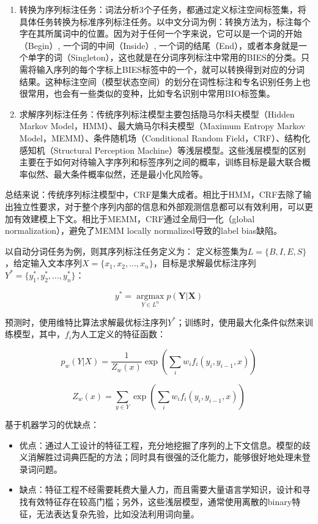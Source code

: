 \begin{enumerate}
\item 转换为序列标注任务：词法分析3个子任务，都通过定义标注空间标签集，将具体任务转换为标准序列标注任务。以中文分词为例：转换方法为，标注每个字在其所属词中的位置。因为对于任何一个字来说，它可以是一个词的开始（Begin）, 一个词的中间（Inside）, 一个词的结尾（End），或者本身就是一个单字的词（Singleton），这也就是在分词序列标注中常用的BIES的分类。只需将输入序列的每个字标上BIES标签中的一个，就可以转换得到对应的分词结果。这种标注空间（模型状态空间）的划分在词性标注和专名识别任务上也很常用，也会有一些类似的变种，比如专名识别中常用BIO标签集。
\item 求解序列标注任务：传统序列标注模型主要包括隐马尔科夫模型（Hidden Markov Model，HMM）\cite{zhang2003chinese}\cite{kupiec1992robust}\cite{yu2006chinese}\cite{morwal2012named}、最大熵马尔科夫模型（Maximum Entropy Markov Model，MEMM）\cite{mccallum2000maximum}\cite{ratnaparkhi1996maximum}\cite{borthwick1999maximum}、条件随机场（Conditional Random Field，CRF）\cite{zhao2006improved}\cite{constant2011mwu}\cite{ekbal2008named}、结构化感知机（Structural Perception Machine）\cite{zhang2007chinese}\cite{zhang2008joint}等浅层模型。这些浅层模型的区别主要在于如何对待输入字序列和标签序列之间的概率，训练目标是最大联合概率似然、最大条件概率似然，还是最小化风险等。
\end{enumerate}

总结来说：传统序列标注模型中，CRF是集大成者。相比于HMM，CRF去除了输出独立性要求，对于整个序列内部的信息和外部观测信息都可以有效利用，可以更加有效建模上下文。相比于MEMM，CRF通过全局归一化（global normalization），避免了MEMM locally normalized导致的label bias缺陷。

以自动分词任务为例，则其序列标注任务定义为：
定义标签集为$L=\{B, I, E, S\}$，给定输入文本序列$X=\{x_{1}, x_{2}, ..., x_{n}\}$，目标是求解最优标注序列$Y^{*}=\{y^{*}_{1}, y^{*}_{2}, ..., y^{*}_{n}\}$：

\[y^{*}=\mathop{\arg\max}\limits_{Y \in L^{n}} p(\bm{Y}|\bm{X})\]

预测时，使用维特比算法求解最优标注序列$Y^{*}$；训练时，使用最大化条件似然来训练模型，其中，$f_{i}$为人工定义的特征函数：

\[p_{w}(Y|X)=\frac{1}{Z_{w}(x)}\exp(\sum_{i} w_{i} f_{i}(y_{i}, y_{i-1}, x))\]

\[Z_{w}(x)=\sum\limits_{y \in Y}\exp(\sum_{i} w_{i} f_{i}(y_{i}, y_{i-1}, x))\]

\noindent
基于机器学习的优缺点：
\begin{itemize}
\item 优点：通过人工设计的特征工程，充分地挖掘了序列的上下文信息。模型的歧义消解胜过词典匹配的方法；同时具有很强的泛化能力，能够很好地处理未登录词问题。
\item 缺点：特征工程不经需要耗费大量人力，而且需要大量语言学知识，设计和寻找有效特征存在较高门槛；另外，这些浅层模型，通常使用离散的binary特征，无法表达复杂先验，比如没法利用词向量。
\end{itemize}

